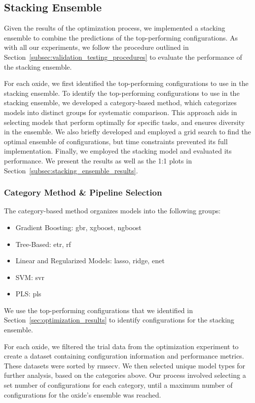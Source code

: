 \subsection{Stacking Ensemble}\label{subsec:stacking_ensemble}
Given the results of the optimization process, we implemented a stacking ensemble to combine the predictions of the top-performing configurations.
As with all our experiments, we follow the procedure outlined in Section~\ref{subsec:validation_testing_procedures} to evaluate the performance of the stacking ensemble.

For each oxide, we first identified the top-performing configurations to use in the stacking ensemble.
To identify the top-performing configurations to use in the stacking ensemble, we developed a category-based method, which categorizes models into distinct groups for systematic comparison.
This approach aids in selecting models that perform optimally for specific tasks, and ensures diversity in the ensemble.
We also briefly developed and employed a grid search to find the optimal ensemble of configurations, but time constraints prevented its full implementation.
Finally, we employed the stacking model and evaluated its performance.
We present the results as well as the 1:1 plots in Section~\ref{subsec:stacking_ensemble_results}.

\subsubsection{Category Method \& Pipeline Selection}\label{subsec:category_method}
The category-based method organizes models into the following groups:

\begin{itemize}
    \item Gradient Boosting: \gls{gbr}, \gls{xgboost}, \gls{ngboost}
    \item Tree-Based: \gls{etr}, \gls{rf}
    \item Linear and Regularized Models: \gls{lasso}, \gls{ridge}, \gls{enet}
    \item SVM: \gls{svr}
    \item PLS: \gls{pls}
\end{itemize}

We use the top-performing configurations that we identified in Section~\ref{sec:optimization_results} to identify configurations for the stacking ensemble.

For each oxide, we filtered the trial data from the optimization experiment to create a dataset containing configuration information and performance metrics.
These datasets were sorted by \gls{rmsecv}.
We then selected unique model types for further analysis, based on the categories above.
Our process involved selecting a set number of configurations for each category, until a maximum number of configurations for the oxide's ensemble was reached.

